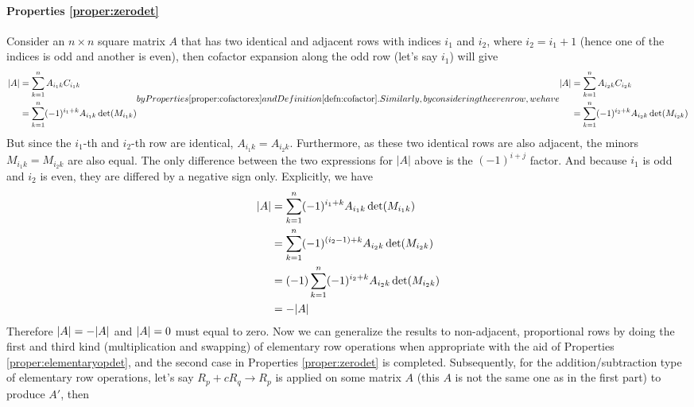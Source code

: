 \paragraph{Properties \ref*{proper:zerodet}}
Consider an $n \times n$ square matrix $A$ that has two identical and adjacent rows with indices $i_1$ and $i_2$, where $i_2 = i_1 + 1$ (hence one of the indices is odd and another is even), then cofactor expansion along the odd row (let's say $i_1$) will give
\begin{subequations}
\begin{align}
\abs{A} &= \sum_{k=1}^{n} A_{i_1k}C_{i_1k} \nonumber \\
&= \sum_{k=1}^{n} (-1)^{i_1+k}A_{i_1k}\det(M_{i_1k})
\end{align}
by Properties \ref{proper:cofactorex} and Definition \ref{defn:cofactor}. Similarly, by considering the even row, we have
\begin{align}
\abs{A} &= \sum_{k=1}^{n} A_{i_2k}C_{i_2k} \nonumber \\
&= \sum_{k=1}^{n} (-1)^{i_2+k}A_{i_2k}\det(M_{i_2k})
\end{align}
\end{subequations}
But since the $i_1$-th and $i_2$-th row are identical, $A_{i_1k} = A_{i_2k}$. Furthermore, as these two identical rows are also adjacent, the minors $M_{i_1k} = M_{i_2k}$ are also equal. The only difference between the two expressions for $|A|$ above is the $(-1)^{i+j}$ factor. And because $i_1$ is odd and $i_2$ is even, they are differed by a negative sign only. Explicitly, we have
\begin{align}
\abs{A} &= \sum_{k=1}^{n} (-1)^{i_1+k}A_{i_1k}\det(M_{i_1k}) \nonumber \\
&= \sum_{k=1}^{n} (-1)^{(i_2-1)+k}A_{i_2k}\det(M_{i_2k}) \nonumber \\
&= (-1) \sum_{k=1}^{n} (-1)^{i_2+k}A_{i_2k}\det(M_{i_2k}) \nonumber \\
&= -\abs{A}
\end{align}
Therefore $\abs{A} = -\abs{A}$ and $\abs{A} = 0$ must equal to zero. Now we can generalize the results to non-adjacent, proportional rows by doing the first and third kind (multiplication and swapping) of elementary row operations when appropriate with the aid of Properties \ref{proper:elementaryopdet}, and the second case in Properties \ref{proper:zerodet} is completed. Subsequently, for the addition/subtraction type of elementary row operations, let's say $R_{p} + cR_{q} \to R_{p}$ is applied on some matrix $A$ (this $A$ is not the same one as in the first part) to produce $A'$, then
